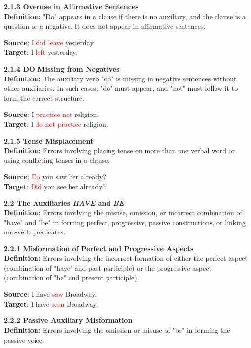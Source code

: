 \begin{tcolorbox}[breakable]
\noindent \textbf{2.1.3 Overuse in Affirmative Sentences}\\
\textbf{Definition:} "Do" appears in a clause if there is no auxiliary, and the clause is a question or a negative. It does not appear in affirmative sentences.


\textbf{Source}: I \textcolor{red}{did leave} yesterday. \\
\textbf{Target}: I \textcolor{red}{left} yesterday.


\noindent \textbf{2.1.4 DO Missing from Negatives}\\
\textbf{Definition:} The auxiliary verb "do" is missing in negative sentences without other auxiliaries. In such cases, "do" must appear, and "not" must follow it to form the correct structure.


\textbf{Source}: I \textcolor{red}{practice not} religion. \\
\textbf{Target}: I \textcolor{red}{do not practice} religion.


\noindent \textbf{2.1.5 Tense Misplacement}\\
\textbf{Definition:} Errors involving placing tense on more than one verbal word or using conflicting tenses in a clause.


\textbf{Source}: \textcolor{red}{Do} you saw her already? \\
\textbf{Target}: \textcolor{red}{Did} you see her already?


\noindent \textbf{2.2 The Auxiliaries \textit{HAVE} and \textit{BE}}\\
\textbf{Definition:} Errors involving the misuse, omission, or incorrect combination of "have" and "be" in forming perfect, progressive, passive constructions, or linking non-verb predicates.

\noindent \textbf{2.2.1 Misformation of Perfect and Progressive Aspects}\\
\textbf{Definition:} Errors involving the incorrect formation of either the perfect aspect (combination of "have" and past participle) or the progressive aspect (combination of "be" and present participle).


\textbf{Source}: I have \textcolor{red}{saw} Broadway. \\
\textbf{Target}: I have \textcolor{red}{seen} Broadway.


\noindent \textbf{2.2.2 Passive Auxiliary Misformation}\\
\textbf{Definition:} Errors involving the omission or misuse of "be" in forming the passive voice.



\end{tcolorbox}

